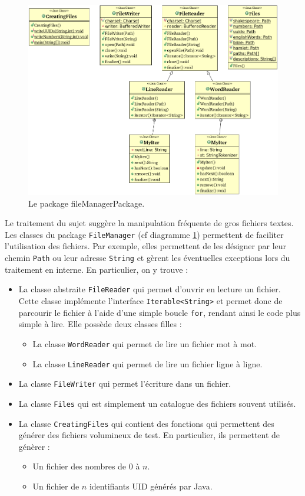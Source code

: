 \documentclass[12pt,a4paper,titlepage]{article}
\newcommand{\class}[1]{\texttt{#1}}
\begin{document}
\begin{figure}
	\label{fig:fileManagerPackage}
	\centering
	\includegraphics[scale=0.65, angle=90]{../Java Workspace/Test Hash/fileManagerPackage.png}
	\caption{Le package fileManagerPackage.}
\end{figure}

Le traitement du sujet suggère la manipulation fréquente de gros fichiers textes.\\
Les classes du package \class{FileManager} (cf diagramme \ref{fig:fileManagerPackage}) permettent de faciliter l'utilisation des fichiers. Par exemple, elles permettent de les désigner par leur chemin \class{Path} ou leur adresse \class{String} et gèrent les éventuelles exceptions lors du traitement en interne. En particulier, on y trouve :
\begin{itemize}
\item La classe abstraite \class{FileReader} qui permet d'ouvrir en lecture un fichier.\\
	Cette classe implémente l'interface \class{Iterable<String>} et permet donc de parcourir le fichier à l'aide d'une simple boucle \class{for}, rendant ainsi le code plus simple à lire.
	Elle possède deux classes filles :
	\begin{itemize}
	\item La classe \class{WordReader} qui permet de lire un fichier mot à mot.
	\item La classe \class{LineReader} qui permet de lire un fichier ligne à ligne.
	\end{itemize}
\item La classe \class{FileWriter} qui permet l'écriture dans un fichier.
\item La classe \class{Files} qui est simplement un catalogue des fichiers souvent utilisés.
\item La classe \class{CreatingFiles} qui contient des fonctions qui permettent des générer des fichiers volumineux de test. En particulier, ils permettent de génèrer :
	\begin{itemize}
	\item Un fichier des nombres de $0$ à $n$.
	\item Un fichier de $n$ identifiants UID générés par Java.
	\end{itemize}
\end{itemize}
\end{document}
